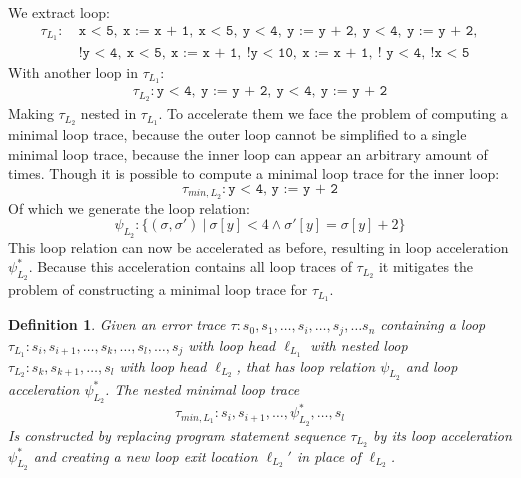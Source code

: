 \documentclass{article}
\newcommand{\loc}[1]{\ensuremath{\ell_{#1}}\xspace}
\newtheorem{mydef}{Definition}
\begin{document}
We extract loop:
\begin{align*}
	\tau_{L_1}:\  & \texttt{x < 5},\ \texttt{x := x + 1},\ \texttt{x < 5},\ \texttt{y < 4},\ \texttt{y := y + 2},\ \texttt{y < 4},\ \texttt{y := y + 2}, \\ &\texttt{!y < 4},\
	\texttt{x < 5},\ \texttt{x := x + 1},\ \texttt{!y < 10},\ \texttt{x := x + 1},\ \texttt{! y < 4},\ \texttt{!x < 5}
\end{align*}
With another loop in $\tau_{L_1}$:
\begin{align*}
	\tau_{L_2}: \texttt{y < 4},\ \texttt{y := y + 2},\ \texttt{y < 4},\ \texttt{y := y + 2}
\end{align*}
Making $\tau_{L_2}$ nested in $\tau_{L_1}$. To accelerate them we face the problem of computing a minimal loop trace, because the outer loop cannot be simplified to a single minimal loop trace, because the inner loop can appear an arbitrary amount of times. Though it is possible to compute a minimal loop trace for the inner loop:
\begin{equation*}
	\tau_{min, {L_2}}: \texttt{y < 4,\ y := y + 2}
\end{equation*}
Of which we generate the loop relation:
\begin{equation*}
	\psi_{L_{2}}: \{(\sigma, \sigma')\ |\ \sigma[y] < 4 \land \sigma'[y] = \sigma[y] + 2 \}
\end{equation*}
This loop relation can now be accelerated as before, resulting in loop acceleration $\psi_{L_{2}}^*$. Because this acceleration contains all loop traces of $\tau_{L_2}$ it mitigates the problem of constructing a minimal loop trace for $\tau_{L_1}$.

\begin{mydef}
	Given an error trace $\tau: s_0, s_1, \ldots, s_i, \ldots, s_j, \ldots s_n$ containing a loop \\ $\tau_{L_1}: s_i, s_{i+1}, \ldots, s_k, \ldots, s_l, \ldots, s_j$ with loop head $\loc{L_1}$ with nested loop $\tau_{L_2}: s_k, s_{k+1}, \ldots, s_l$ with loop head $\loc{L_2}$, that has loop relation $\psi_{L_{2}}$ and loop acceleration $\psi_{L_{2}}^*$. The nested minimal loop trace
	\begin{equation*}
		\tau_{min, {L_1}} : s_i, s_{i+1}, \ldots, \psi_{L_{2}}^*, \ldots, s_l
	\end{equation*}
	Is constructed by replacing program statement sequence $\tau_{L_2}$ by its loop acceleration $\psi_{L_{2}}^*$ and creating a new loop exit location $\loc{L_2}'$ in place of $\loc{L_2}$.
\end{mydef}
\end{document}
